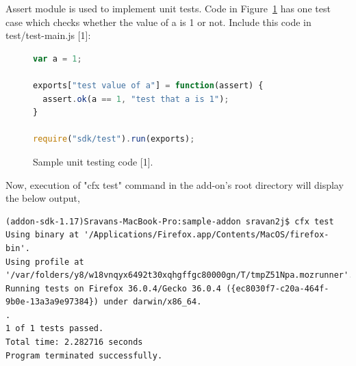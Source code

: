 Assert module is used to implement unit tests. Code in Figure~\ref{fig:unittesting} has one test case which checks whether the value of a is 1 or not. Include this code in test/test-main.js [1]:

\begin{figure}[h]
  \centering

\begin{lstlisting}[language=JavaScript] 
var a = 1;

exports["test value of a"] = function(assert) {
  assert.ok(a == 1, "test that a is 1");
}

require("sdk/test").run(exports);
\end{lstlisting}
    \caption[Sample unit testing code]{Sample unit testing code [1].}
    \label{fig:unittesting}
\end{figure}
Now, execution of "cfx test" command in the add-on's root directory will display the below output,
\begin{lstlisting}[frame=none,numbers=none,mathescape=false]
(addon-sdk-1.17)Sravans-MacBook-Pro:sample-addon sravan2j$ cfx test
Using binary at '/Applications/Firefox.app/Contents/MacOS/firefox-bin'.
Using profile at '/var/folders/y8/w18vnqyx6492t30xqhgffgc80000gn/T/tmpZ51Npa.mozrunner'.
Running tests on Firefox 36.0.4/Gecko 36.0.4 ({ec8030f7-c20a-464f-9b0e-13a3a9e97384}) under darwin/x86_64.
.
1 of 1 tests passed.
Total time: 2.282716 seconds
Program terminated successfully.
\end{lstlisting}
